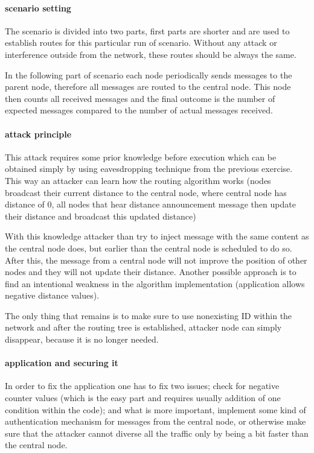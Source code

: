 \documentclass[
  print, %
  table,   %
  nolof,     %
  nolot,     %
           oneside
]{fithesis3}
\begin{document}
    \paragraph{scenario setting}
    The scenario is divided into two parts, first parts are shorter and are used to establish routes for this particular run of scenario. Without any attack or interference outside from the network, these routes should be always the same.

    In the following part of scenario each node periodically sends messages to the parent node, therefore all messages are routed to the central node. This node then counts all received messages and the final outcome is the number of expected messages compared to the number of actual messages received.

    \paragraph{attack principle}
    This attack requires some prior knowledge before execution which can be obtained simply by using eavesdropping technique from the previous exercise. This way an attacker can learn how the routing algorithm works (nodes broadcast their current distance to the central node, where central node has distance of 0, all nodes that hear distance announcement message then update their distance and broadcast this updated distance)

    With this knowledge attacker than try to inject message with the same content as the central node does, but earlier than the central node is scheduled to do so. After this, the message from a central node will not improve the position of other nodes and they will not update their distance. Another possible approach is to find an intentional weakness in the algorithm implementation (application allows negative distance values).

    The only thing that remains is to make sure to use nonexisting ID within the network and after the routing tree is established, attacker node can simply disappear, because it is no longer needed.

    \paragraph{application and securing it}
    In order to fix the application one has to fix two issues; check for negative counter values (which is the easy part and requires usually addition of one condition within the code); and what is more important, implement some kind of authentication mechanism for messages from the central node, or otherwise make sure that the attacker cannot diverse all the traffic only by being a bit faster than the central node.
\end{document}
